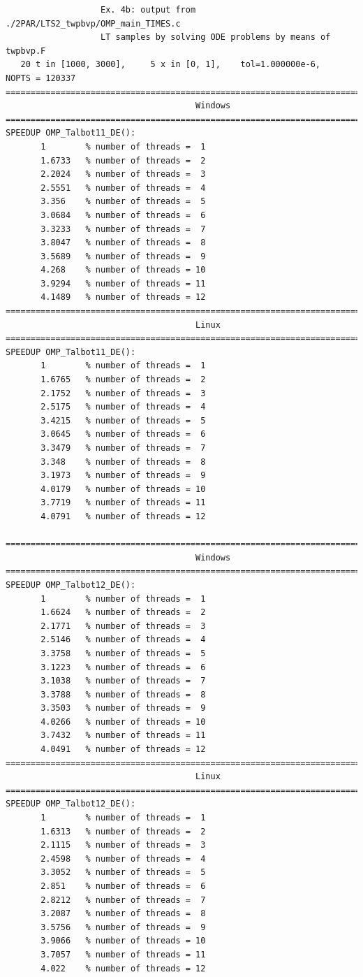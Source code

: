 \documentclass[a4paper,10pt]{report}%
\begin{document}
\begin{lstlisting}
                   Ex. 4b: output from ./2PAR/LTS2_twpbvp/OMP_main_TIMES.c
                   LT samples by solving ODE problems by means of twpbvp.F
   20 t in [1000, 3000],     5 x in [0, 1],    tol=1.000000e-6,    NOPTS = 120337
====================================================================================
                                      Windows
====================================================================================
SPEEDUP OMP_Talbot11_DE():
       1        % number of threads =  1
       1.6733   % number of threads =  2
       2.2024   % number of threads =  3
       2.5551   % number of threads =  4
       3.356    % number of threads =  5
       3.0684   % number of threads =  6
       3.3233   % number of threads =  7
       3.8047   % number of threads =  8
       3.5689   % number of threads =  9
       4.268    % number of threads = 10
       3.9294   % number of threads = 11
       4.1489   % number of threads = 12
====================================================================================
                                      Linux
====================================================================================
SPEEDUP OMP_Talbot11_DE():
       1        % number of threads =  1
       1.6765   % number of threads =  2
       2.1752   % number of threads =  3
       2.5175   % number of threads =  4
       3.4215   % number of threads =  5
       3.0645   % number of threads =  6
       3.3479   % number of threads =  7
       3.348    % number of threads =  8
       3.1973   % number of threads =  9
       4.0179   % number of threads = 10
       3.7719   % number of threads = 11
       4.0791   % number of threads = 12

====================================================================================
                                      Windows
====================================================================================
SPEEDUP OMP_Talbot12_DE():
       1        % number of threads =  1
       1.6624   % number of threads =  2
       2.1771   % number of threads =  3
       2.5146   % number of threads =  4
       3.3758   % number of threads =  5
       3.1223   % number of threads =  6
       3.1038   % number of threads =  7
       3.3788   % number of threads =  8
       3.3503   % number of threads =  9
       4.0266   % number of threads = 10
       3.7432   % number of threads = 11
       4.0491   % number of threads = 12
====================================================================================
                                      Linux
====================================================================================
SPEEDUP OMP_Talbot12_DE():
       1        % number of threads =  1
       1.6313   % number of threads =  2
       2.1115   % number of threads =  3
       2.4598   % number of threads =  4
       3.3052   % number of threads =  5
       2.851    % number of threads =  6
       2.8212   % number of threads =  7
       3.2087   % number of threads =  8
       3.5756   % number of threads =  9
       3.9066   % number of threads = 10
       3.7057   % number of threads = 11
       4.022    % number of threads = 12


\end{lstlisting}
\end{document}
